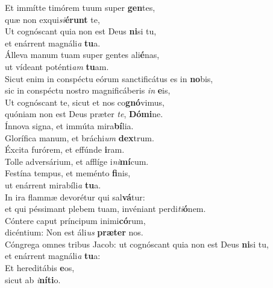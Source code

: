\evenverse Et immítte timórem tuum super \textbf{gen}tes,~\*\\
\evenverse quæ non exqui\textit{si}\textbf{é}\textbf{runt} te,\\
\oddverse Ut cognóscant quia non est Deus \textbf{ni}si tu,~\*\\
\oddverse et enárrent magnáli\textit{a} \textbf{tu}a.\\
\evenverse Álleva manum tuam super gentes ali\textbf{é}nas,~\*\\
\evenverse ut vídeant poténti\textit{am} \textbf{tu}am.\\
\oddverse Sicut enim in conspéctu eórum sanctificátus es in \textbf{no}bis,~\*\\
\oddverse sic in conspéctu nostro magnificáberis \textit{in} \textbf{e}is,\\
\evenverse Ut cognóscant te, sicut et nos co\textbf{gnó}vimus,~\*\\
\evenverse quóniam non est Deus præter \textit{te}, \textbf{Dó}\textbf{mi}ne.\\
\oddverse Ínnova signa, et immúta mira\textbf{bí}lia.~\*\\
\oddverse Glorífica manum, et bráchi\textit{um} \textbf{dex}trum.\\
\evenverse Éxcita furórem, et effúnde \textbf{i}ram.~\*\\
\evenverse Tolle adversárium, et afflíge i\textit{ni}\textbf{mí}cum.\\
\oddverse Festína tempus, et meménto \textbf{fi}nis,~\*\\
\oddverse ut enárrent mirabíli\textit{a} \textbf{tu}a.\\
\evenverse In ira flammæ devorétur qui sal\textbf{vá}tur:~\*\\
\evenverse et qui péssimant plebem tuam, invéniant perdi\textit{ti}\textbf{ó}nem.\\
\oddverse Cóntere caput príncipum inimi\textbf{có}rum,~\*\\
\oddverse dicéntium: Non est áli\textit{us} \textbf{præ}\textbf{ter} nos.\\
\evenverse Cóngrega omnes tribus Jacob: ut cognóscant quia non est Deus \textbf{ni}si tu,~\*\\
\evenverse et enárrent magnáli\textit{a} \textbf{tu}a:\\
\oddverse Et hereditábis \textbf{e}os,~\*\\
\oddverse sicut ab \textit{i}\textbf{ní}\textbf{ti}o.\\
